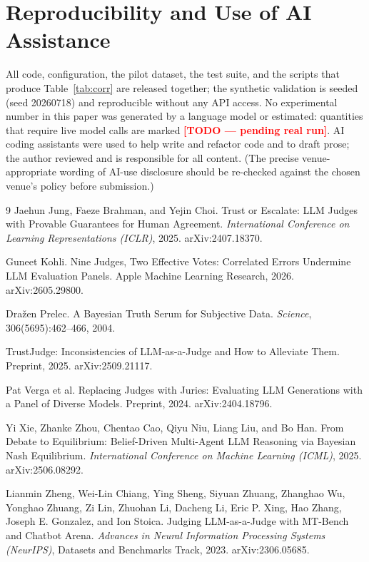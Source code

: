 \documentclass[11pt]{article}
\newcommand{\todo}[1]{\textcolor{red}{\textbf{[TODO --- #1]}}}
\begin{document}
\section*{Reproducibility and Use of AI Assistance}
All code, configuration, the pilot dataset, the test suite, and the scripts that
produce Table~\ref{tab:corr} are released together; the synthetic validation is
seeded (seed 20260718) and reproducible without any API access. No experimental
number in this paper was generated by a language model or estimated: quantities
that require live model calls are marked \todo{pending real run}. AI coding
assistants were used to help write and refactor code and to draft prose; the
author reviewed and is responsible for all content. (The precise
venue-appropriate wording of AI-use disclosure should be re-checked against the
chosen venue's policy before submission.)

\begin{thebibliography}{9}
 Jaehun Jung, Faeze Brahman, and Yejin Choi.
Trust or Escalate: LLM Judges with Provable Guarantees for Human Agreement.
\emph{International Conference on Learning Representations (ICLR)}, 2025.
arXiv:2407.18370.

 Guneet Kohli. Nine Judges, Two Effective Votes:
Correlated Errors Undermine LLM Evaluation Panels. Apple Machine Learning
Research, 2026. arXiv:2605.29800.

 Dra\v{z}en Prelec. A Bayesian Truth Serum for
Subjective Data. \emph{Science}, 306(5695):462--466, 2004.

 TrustJudge: Inconsistencies of
LLM-as-a-Judge and How to Alleviate Them. Preprint, 2025. arXiv:2509.21117.

 Pat Verga et al. Replacing Judges with
Juries: Evaluating LLM Generations with a Panel of Diverse Models. Preprint,
2024. arXiv:2404.18796.

 Yi Xie, Zhanke Zhou, Chentao Cao, Qiyu Niu,
Liang Liu, and Bo Han. From Debate to Equilibrium: Belief-Driven Multi-Agent LLM
Reasoning via Bayesian Nash Equilibrium. \emph{International Conference on
Machine Learning (ICML)}, 2025. arXiv:2506.08292.

 Lianmin Zheng, Wei-Lin Chiang, Ying
Sheng, Siyuan Zhuang, Zhanghao Wu, Yonghao Zhuang, Zi Lin, Zhuohan Li, Dacheng
Li, Eric P. Xing, Hao Zhang, Joseph E. Gonzalez, and Ion Stoica. Judging
LLM-as-a-Judge with MT-Bench and Chatbot Arena. \emph{Advances in Neural
Information Processing Systems (NeurIPS)}, Datasets and Benchmarks Track, 2023.
arXiv:2306.05685.
\end{thebibliography}
\end{document}
